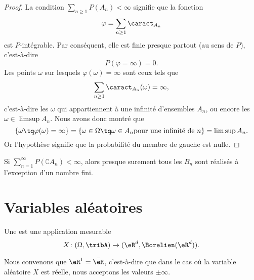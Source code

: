 \begin{proof}
	La condition \( \sum_{n\geq 1}P(A_n)<\infty\) signifie que la fonction
	\begin{equation}
		\varphi=\sum_{n\geq 1}\caract_{A_n}
	\end{equation}
	est \( P\)-intégrable. Par conséquent, elle est finie presque partout (au sens de \( P\)), c'est-à-dire
	\begin{equation}
		P(\varphi=\infty)=0.
	\end{equation}
	Les points \( \omega\) sur lesquels \( \varphi(\omega)=\infty\) sont ceux tels que
	\begin{equation}
		\sum_{n\geq 1}\caract_{A_n}(\omega)=\infty,
	\end{equation}
	c'est-à-dire les \( \omega\) qui appartiennent à une infinité d'ensembles \( A_n\), ou encore les \( \omega\in\limsup A_n\). Nous avons donc montré que
	\begin{equation}
		\{ \omega\tq \varphi(\omega)=\infty \}=\{ \omega\in\Omega\tq \omega\in A_n\text{pour une infinité de } n \}=\limsup A_n.
	\end{equation}
	Or l'hypothèse signifie que la probabilité du membre de gauche est nulle.
\end{proof}

\begin{corollary}       \label{CORooUWLZooFLYmcY}
	Si \( \sum_{n=1}^{\infty}P(\complement A_n)<\infty\), alors presque surement tous les \( B_n\) sont réalisés à l'exception d'un nombre fini.
\end{corollary}

\section{Variables aléatoires}

\begin{definition}      \label{DEFooSZRXooQUSZYU}
	Une  est une application mesurable
	\begin{equation}
		X\colon (\Omega,\tribA)\to (\eR^d,\Borelien(\eR^d)).
	\end{equation}
\end{definition}
Nous convenons que \( \eR^1=\bar\eR\), c'est-à-dire que dans le cas où la variable aléatoire \( X\) est réelle, nous acceptons les valeurs \( \pm\infty\).

